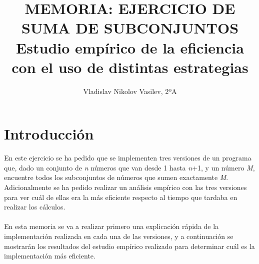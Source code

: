 \documentclass{article}
\title{
	MEMORIA: EJERCICIO DE SUMA DE SUBCONJUNTOS \\ %
	\large Estudio empírico de la eficiencia \\
	con el uso de distintas estrategias}
\author{Vladislav Nikolov Vasilev, 2ºA}
\begin{document}
  \maketitle			  %
  \newpage				  %
  
  \section{Introducción}
  En este ejercicio se ha pedido que se implementen tres versiones de un programa que, dado un conjunto de \textit{n} números que van desde 1 hasta \textit{n}+1, y un número \textit{M}, encuentre todos los subconjuntos de números que sumen exactamente \textit{M}. Adicionalmente se ha pedido realizar un análisis empírico con las tres versiones para ver cuál de ellas era la más eficiente respecto al tiempo que tardaba en realizar los cálculos.\\\\
  En esta memoria se va a realizar primero una explicación rápida de la implementación realizada en cada una de las versiones, y a continuación se mostrarán los resultados del estudio empírico realizado para determinar cuál es la implementación más eficiente.
  
\end{document}
